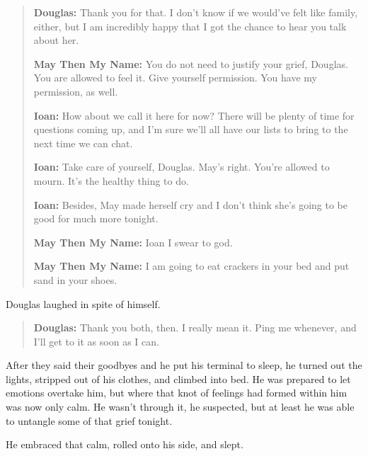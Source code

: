 \begin{quote}
\textbf{Douglas:} Thank you for that. I don't know if we would've felt like family, either, but I am incredibly happy that I got the chance to hear you talk about her.

\textbf{May Then My Name:} You do not need to justify your grief, Douglas. You are allowed to feel it. Give yourself permission. You have my permission, as well.

\textbf{Ioan:} How about we call it here for now? There will be plenty of time for questions coming up, and I'm sure we'll all have our lists to bring to the next time we can chat.

\textbf{Ioan:} Take care of yourself, Douglas. May's right. You're allowed to mourn. It's the healthy thing to do.

\textbf{Ioan:} Besides, May made herself cry and I don't think she's going to be good for much more tonight.

\textbf{May Then My Name:} Ioan I swear to god.

\textbf{May Then My Name:} I am going to eat crackers in your bed and put sand in your shoes.
\end{quote}

\noindent Douglas laughed in spite of himself.

\begin{quote}
\textbf{Douglas:} Thank you both, then. I really mean it. Ping me whenever, and I'll get to it as soon as I can.
\end{quote}

\noindent After they said their goodbyes and he put his terminal to sleep, he turned out the lights, stripped out of his clothes, and climbed into bed. He was prepared to let emotions overtake him, but where that knot of feelings had formed within him was now only calm. He wasn't through it, he suspected, but at least he was able to untangle some of that grief tonight.

He embraced that calm, rolled onto his side, and slept.
